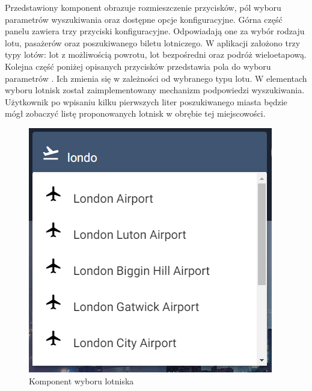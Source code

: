 \documentclass[12pt, twoside]{report}
\begin{document}
Przedstawiony  komponent obrazuje rozmieszczenie przycisków, pól wyboru parametrów wyszukiwania oraz dostępne opcje konfiguracyjne. Górna część panelu zawiera trzy przyciski konfiguracyjne. Odpowiadają one  za wybór rodzaju lotu,  pasażerów oraz  poszukiwanego biletu lotniczego. W aplikacji założono trzy typy lotów: lot z możliwością powrotu, lot bezpośredni oraz podróż wieloetapową. Kolejna część\add{,} poniżej opisanych przycisków przedstawia pola do wyboru parametrów . Ich  zmienia się w zależności od wybranego typu lotu.
W elementach wyboru lotnisk został zaimplementowany mechanizm podpowiedzi wyszukiwania. Użytkownik po wpisaniu kilku pierwszych liter poszukiwanego miasta będzie mógł zobaczyć listę proponowanych lotnisk w obrębie tej miejscowości. 
\begin{figure}[!ht]
\centering
\includegraphics[scale=0.8, keepaspectratio]{airport_choose.png}
\caption{Komponent wyboru lotniska}
\label{fig:airport_choose}
\end{figure}
\end{document}
